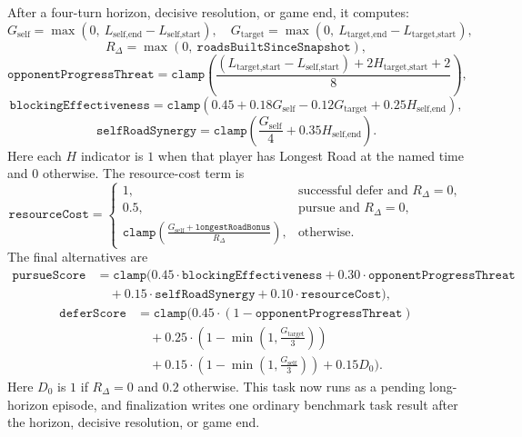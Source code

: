 \documentclass[letter,  12 pt]{article}
\begin{document}
After a four-turn horizon, decisive resolution, or game end, it computes:
\[
G_{\text{self}} = \max(0,\ L_{\text{self,end}} - L_{\text{self,start}}),
\quad
G_{\text{target}} = \max(0,\ L_{\text{target,end}} - L_{\text{target,start}}),
\]
\[
R_{\Delta} = \max(0,\ \texttt{roadsBuiltSinceSnapshot}),
\]
\[
\texttt{opponentProgressThreat}
= \texttt{clamp}\left(
\frac{(L_{\text{target,start}} - L_{\text{self,start}}) + 2H_{\text{target,start}} + 2}{8}
\right),
\]
\[
\texttt{blockingEffectiveness}
= \texttt{clamp}(0.45 + 0.18G_{\text{self}} - 0.12G_{\text{target}} + 0.25H_{\text{self,end}}),
\]
\[
\texttt{selfRoadSynergy}
= \texttt{clamp}\left(\frac{G_{\text{self}}}{4} + 0.35H_{\text{self,end}}\right).
\]
Here each $H$ indicator is $1$ when that player has Longest Road at the named time and $0$ otherwise. The resource-cost term is
\[
\texttt{resourceCost} =
\begin{cases}
1, & \text{successful defer and } R_{\Delta}=0,\\
0.5, & \text{pursue and } R_{\Delta}=0,\\
\texttt{clamp}\left(\frac{G_{\text{self}} + \texttt{longestRoadBonus}}{R_{\Delta}}\right), & \text{otherwise}.
\end{cases}
\]
The final alternatives are
\[
\begin{aligned}
\texttt{pursueScore}
&= \texttt{clamp}(
0.45 \cdot \texttt{blockingEffectiveness}
+ 0.30 \cdot \texttt{opponentProgressThreat} \\
&\quad + 0.15 \cdot \texttt{selfRoadSynergy}
+ 0.10 \cdot \texttt{resourceCost}),
\end{aligned}
\]
\[
\begin{aligned}
\texttt{deferScore}
&= \texttt{clamp}\bigl(
0.45 \cdot (1 - \texttt{opponentProgressThreat}) \\
&\quad + 0.25 \cdot \left(1 - \min\left(1,\frac{G_{\text{target}}}{3}\right)\right) \\
&\quad + 0.15 \cdot \left(1 - \min\left(1,\frac{G_{\text{self}}}{3}\right)\right)
+ 0.15D_0\bigr).
\end{aligned}
\]
Here $D_0$ is $1$ if $R_{\Delta}=0$ and $0.2$ otherwise.
This task now runs as a pending long-horizon episode, and finalization writes one ordinary benchmark task result after the horizon, decisive resolution, or game end.
\end{document}
